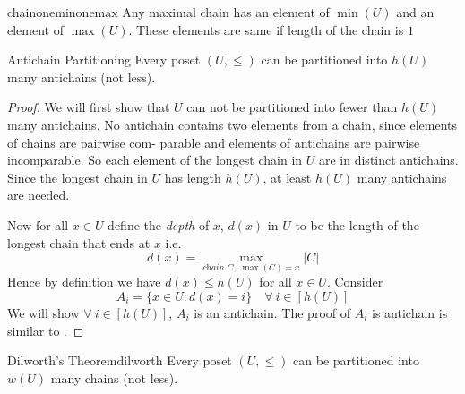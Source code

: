 \documentclass[twoside]{article}
\begin{document}
\begin{lemma}{}{chainoneminonemax}
	Any maximal chain has an element of $\min(U)$ and an element of $\max(U)$. These elements are same if length of the chain is $1$
\end{lemma}
\begin{Theorem}{Antichain Partitioning}{}
	Every poset $(U,\leq )$ can be partitioned into $h(U)$ many antichains (not less). 
\end{Theorem}
\begin{proof}
	We will first show that $U$ can not be partitioned into fewer than $h(U)$ many antichains. No antichain contains two elements from a chain,  since elements of chains are pairwise com-
	parable and elements of antichains are pairwise incomparable. So each element of the longest chain in $U$ are in distinct antichains. Since the longest chain in $U$ has length $h(U)$, at least $h(U)$ many antichains are needed.
	
	Now for all $x\in U$ define the \textit{depth} of $x$, $d(x)$ in $U$ to be the length of the longest chain that ends at $x$ i.e. $$d(x)=\max\limits_{\textit{chain $C$},\; \max(C)=x}|C|$$Hence by definition we have $d(x)\leq h(U)$ for all $x\in U$. Consider $$A_i=\{x\in U\colon d(x)=i\}\quad\forall\ i\in[h(U)]$$We will show $\forall\ i\in[h(U)]$, $A_i$ is an antichain. The proof of $A_i$ is antichain is similar to .
\end{proof}
\begin{Theorem}{Dilworth's Theorem}{dilworth}
	Every poset $(U,\leq)$ can be partitioned into $w(U)$ many chains (not less).
\end{Theorem}
\end{document}
